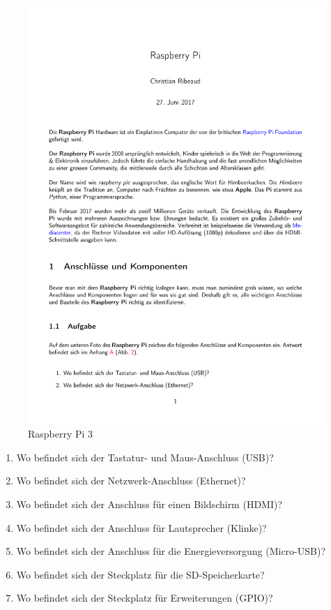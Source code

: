 \documentclass[12pt,a4paper]{article}
\begin{document}
\begin{figure}[h]
\centering
\includegraphics[scale=1.3]{raspberry}
\caption{Raspberry Pi 3}
\label{fig:rp}
\end{figure}

\begin{enumerate}
\item Wo befindet sich der Tastatur- und Maus-Anschluss (USB)?
\item Wo befindet sich der Netzwerk-Anschluss (Ethernet)?
\item Wo befindet sich der Anschluss für einen Bildschirm (HDMI)?
\item Wo befindet sich der Anschluss für Lautsprecher (Klinke)?
\item Wo befindet sich der Anschluss für die Energieversorgung (Micro-USB)?
\item Wo befindet sich der Steckplatz für die SD-Speicherkarte?
\item Wo befindet sich der Steckplatz für Erweiterungen (GPIO)?
\end{enumerate}
\end{document}

